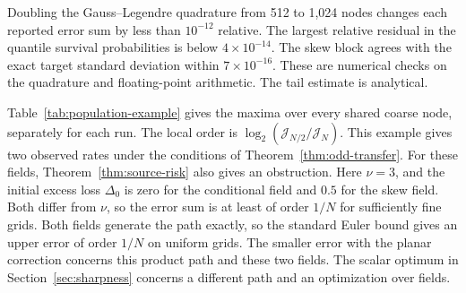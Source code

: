 Doubling the Gauss--Legendre quadrature from 512 to 1,024 nodes changes
each reported error sum by less than $10^{-12}$ relative. The largest
relative residual in the quantile survival probabilities is below
$4\times10^{-14}$. The skew block agrees with the exact target standard
deviation within $7\times10^{-16}$. These are numerical checks on the
quadrature and floating-point arithmetic. The tail estimate is analytical.

Table~\ref{tab:population-example} gives the maxima over every shared
coarse node, separately for each run. The local order is
$\log_2(\mathcal J_{N/2}/\mathcal J_N)$. This example gives two observed
rates under the conditions of Theorem~\ref{thm:odd-transfer}. For these
fields, Theorem~\ref{thm:source-risk} also gives an obstruction. Here
$\nu=3$, and the initial excess loss $\Delta_0$ is zero for the
conditional field and $0.5$ for the skew field. Both differ from $\nu$,
so the error sum is at least of order $1/N$ for sufficiently fine grids.
Both fields generate the path exactly, so the standard Euler bound gives
an upper error of order $1/N$ on uniform grids.
The smaller error with the planar correction concerns this product path
and these two fields. The scalar optimum in Section~\ref{sec:sharpness}
concerns a different path and an optimization over fields.


